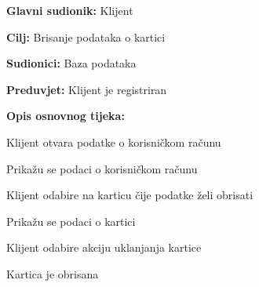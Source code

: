 \noindent {}
\begin{packed_item}
	
	\item \textbf{Glavni sudionik:} Klijent
	\item  \textbf{Cilj:} Brisanje podataka o kartici
	\item  \textbf{Sudionici:} Baza podataka
	\item  \textbf{Preduvjet:} Klijent je registriran
	\item  \textbf{Opis osnovnog tijeka:}
	
	\item[] \begin{packed_enum}
		
		\item Klijent otvara podatke o korisničkom računu
		\item Prikažu se podaci o korisničkom računu
		\item Klijent odabire na karticu čije podatke želi obrisati
		\item Prikažu se podaci o kartici
		\item Klijent odabire akciju uklanjanja kartice
		\item Kartica je obrisana
		
	\end{packed_enum}
\end{packed_item}

